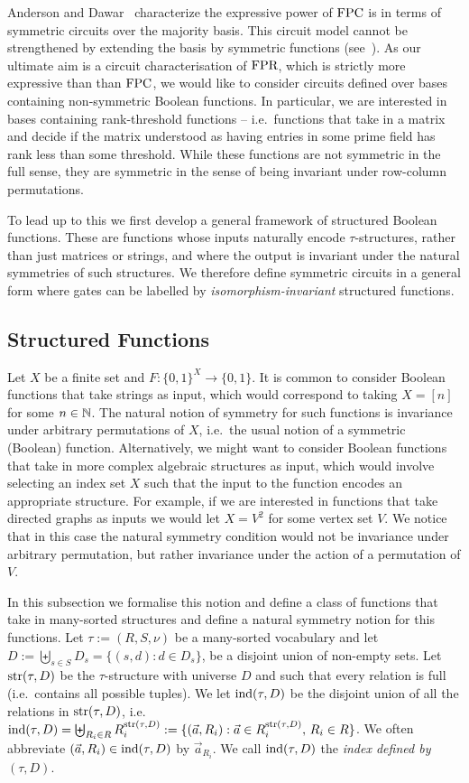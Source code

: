 \documentclass[a4paper,UKenglish]{lipics-v2018}
\begin{document}
Anderson and Dawar~\cite{AndersonD17} characterize the expressive power of
$\text{\upshape FPC}$ is in terms of symmetric circuits over the majority basis. This circuit
model cannot be strengthened by extending the basis by symmetric functions
(see~\cite{DW-arxiv}). As our ultimate aim is a circuit characterisation of
$\text{\upshape FPR}$, which is strictly more expressive than than $\text{\upshape FPC}$, we would like to
consider circuits defined over bases containing non-symmetric Boolean functions.
In particular, we are interested in bases containing rank-threshold functions --
i.e.\ functions that take in a matrix and decide if the matrix understood as
having entries in some prime field has rank less than some threshold. While
these functions are not symmetric in the full sense, they are symmetric in the
sense of being invariant under row-column permutations.

To lead up to this we first develop a general framework of structured Boolean
functions. These are functions whose inputs naturally encode $\tau$-structures,
rather than just matrices or strings, and where the output is invariant under
the natural symmetries of such structures. We therefore define symmetric
circuits in a general form where gates can be labelled by
\emph{isomorphism-invariant} structured functions.

\subsection{Structured Functions}
Let $X$ be a finite set and $F: \{0,1\}^X \rightarrow \{0,1\}$. It is common to
consider Boolean functions that take strings as input, which would correspond to
taking $X = [n]$ for some $n \in \mathbb{N}$. The natural notion of symmetry for such
functions is invariance under arbitrary permutations of $X$, i.e.\ the usual
notion of a symmetric (Boolean) function. Alternatively, we might want to
consider Boolean functions that take in more complex algebraic structures as
input, which would involve selecting an index set $X$ such that the input to the
function encodes an appropriate structure. For example, if we are interested in
functions that take directed graphs as inputs we would let $X = V^2$ for some
vertex set $V$. We notice that in this case the natural symmetry condition would
not be invariance under arbitrary permutation, but rather invariance under the
action of a permutation of $V$.

In this subsection we formalise this notion and define a class of functions that
take in many-sorted structures and define a natural symmetry notion for this
functions. Let $\tau := (R, S, \nu)$ be a many-sorted vocabulary and let $D :=
\biguplus_{s \in S} D_{s} = \{(s,d) : d \in D_s\}$, be a disjoint union of
non-empty sets. Let $\text{str}(\tau, D)$ be the $\tau$-structure with universe $D$
and such that every relation is full (i.e.\ contains all possible tuples). We
let $\text{\upshape ind} (\tau, D)$ be the disjoint union of all the relations in $\text{str}(\tau,
  D)$, i.e.\ $\text{\upshape ind}(\tau, D) = \biguplus_{R_i \in R} R^{\text{str}(\tau,D)}_i := \{
(\vec{a}, R_i) : \vec{a} \in R^{\text{str}(\tau,D)}_i, \, R_i \in R \} $. We often
abbreviate $(\vec{a}, R_i) \in \text{\upshape ind}(\tau, D)$ by $\vec{a}_{R_i}$. We call
$\text{\upshape ind}(\tau, D)$ the \emph{index defined by $(\tau, D)$}.
\end{document}
